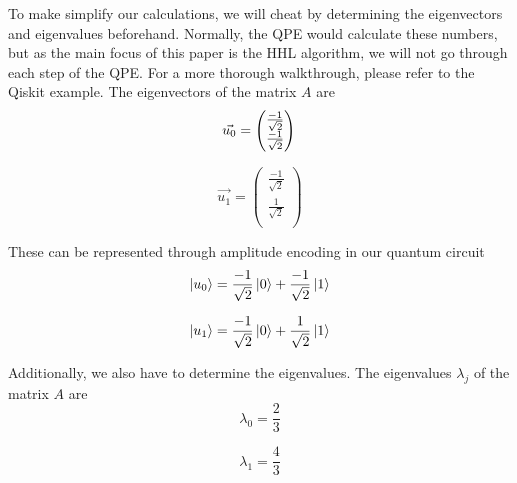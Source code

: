 To make simplify our calculations, we will cheat by determining the eigenvectors and eigenvalues beforehand.
Normally, the QPE would calculate these numbers, but as the main focus of this paper is the HHL algorithm, we will not go through each step of the QPE.
For a more thorough walkthrough, please refer to the Qiskit example.
The eigenvectors of the matrix $A$ are
\begin{equation}
\vec{u_0} = \begin{pmatrix} \frac{-1}{\sqrt{2}}\\ \frac{-1}{\sqrt{2}}\\ \end{pmatrix}\\
\end{equation}

\begin{equation}
\vec{u_1} = \begin{pmatrix} \frac{-1}{\sqrt{2}}\\ \frac{1}{\sqrt{2}}\\ \end{pmatrix}
\end{equation}

These can be represented through amplitude encoding in our quantum circuit
\begin{equation}
\ket{u_0} = \frac{-1}{\sqrt{2}}\ket{0} + \frac{-1}{\sqrt{2}}\ket{1}
\end{equation}

\begin{equation}
\ket{u_1}= \frac{-1}{\sqrt{2}}\ket{0} + \frac{1}{\sqrt{2}}\ket{1} 
\end{equation}

Additionally, we also have to determine the eigenvalues. The eigenvalues $\lambda_j$ of the matrix $A$ are
\begin{equation}
\lambda_0 = \frac{2}{3}
\end{equation}

\begin{equation}
\lambda_1 = \frac{4}{3}
\end{equation}

